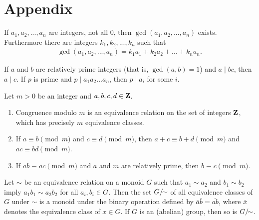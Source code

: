 \chapter*{Appendix}

\begin{namedtheorem}\label{thm:intro-6.5}
    If $a_1,a_2,...,a_n$ are integers, not all 0, then $\gcd(a_1,a_2,...,a_n)$ exists. Furthermore there are integers $k_1,k_2,...,k_n$ such that
        \begin{equation*}
        \begin{split}
            \gcd(a_1,a_2,...,a_n) = k_1 a_1 + k_2 a_2 + ... + k_n a_n.
        \end{split}
        \end{equation*}
\end{namedtheorem}

\begin{namedtheorem}\label{thm:intro-6.6}
    If $a$ and $b$ are relatively prime integers (that is, $\gcd(a,b) = 1$) and $a \mid bc$, then $a \mid c$. If $p$ is prime and $p \mid a_1 a_2 ... a_n$, then $p \mid a_i$ for some $i$.
\end{namedtheorem}

\begin{namedtheorem}\label{thm:intro-6.8}
    Let $m>0$ be an integer and $a,b,c,d \in \mathbf{Z}$.
    \begin{enumerate}[label = (\roman*),itemsep=1pt,topsep=3pt]
        \item Congruence modulo $m$ is an equivalence relation on the set of integers $\mathbf{Z}$, which has precisely $m$ equivalence classes.
        \item If $a \equiv b \pmod{m}$ and $c \equiv d \pmod{m}$, then $a+c \equiv b + d \pmod{m}$ and $ac \equiv bd \pmod{m}$.
        \item If $ab \equiv ac \pmod{m}$ and $a$ and $m$ are relatively prime, then $b \equiv c \pmod{m}$.
    \end{enumerate}
\end{namedtheorem}

\begin{namedtheorem}\label{thm:groups-thm1.5}
    Let $\sim$ be an equivalence relation on a monoid $G$ such that $a_1 \sim a_2$ and $b_1 \sim b_2$ imply $a_1b_1 \sim a_2 b_2$ for all $a_i,b_i \in G$. Then the set $G/\hspace{-4pt}\sim$ of all equivalence classes of $G$ under $\sim$ is a monoid under the binary operation defined by $\overline{a} \overline{b} = \overline{ab}$, where $\overline{x}$ denotes the equivalence class of $x \in G$. If $G$ is an (abelian) group, then so is $G/\hspace{-4pt}\sim$.
\end{namedtheorem}